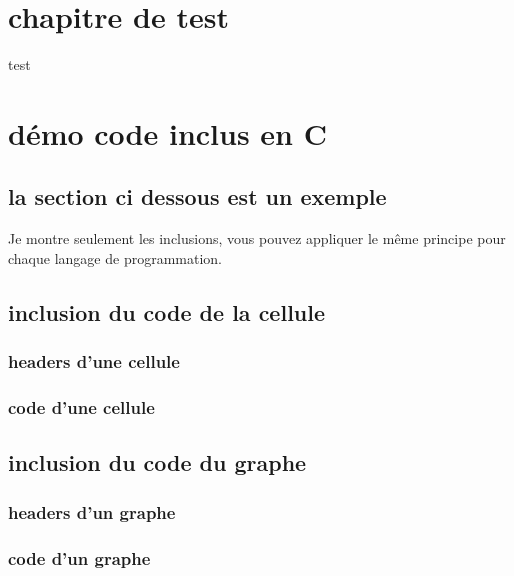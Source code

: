 \documentclass[12pt]{report}
\begin{document}
	\maketitle
	
	\tableofcontents

	\chapter{chapitre de test}

	test
	
	\chapter{démo code inclus en C}

	\section{la section ci dessous est un exemple}
	
	Je montre seulement les inclusions, vous pouvez appliquer le même principe pour chaque langage de programmation.

	\section{inclusion du code de la cellule}	
	
	\subsection{headers d'une cellule}
		

	\newpage	
	
	\subsection{code d'une cellule}
		
		
	\newpage		
	
	\section{inclusion du code du graphe}
	
	\subsection{headers d'un graphe}
	
	
	\newpage	
	
	\subsection{code d'un graphe}
		
		
	
\end{document}
